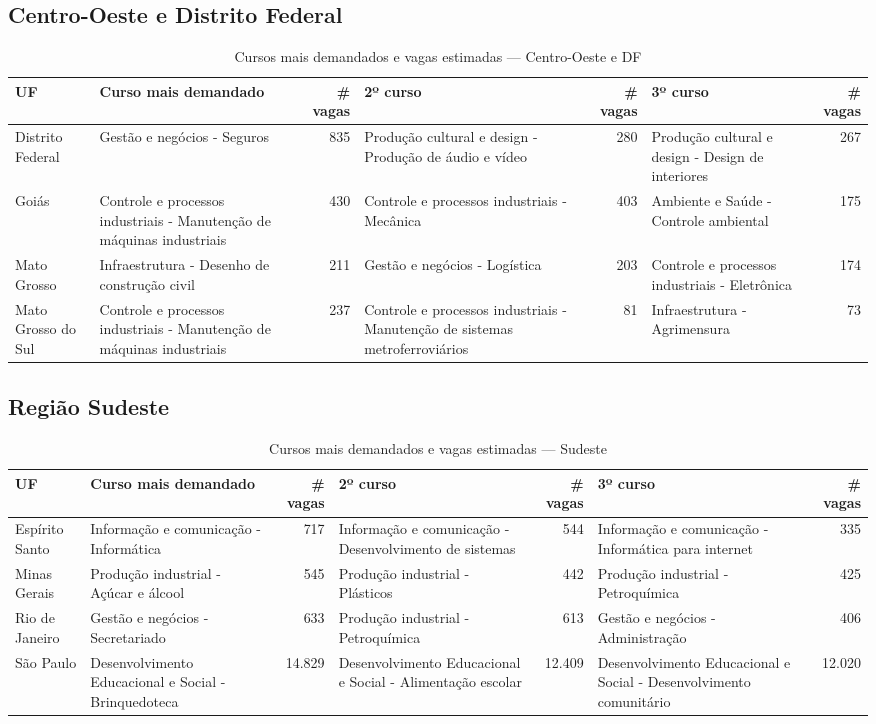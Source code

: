 \subsection{Centro-Oeste e Distrito Federal}
\begin{table}[ht]
\centering
\caption{Cursos mais demandados e vagas estimadas — Centro-Oeste e DF}
\label{tab:centro_oeste_df}
\begin{tabular}{l l r l r l r}
\toprule
UF & Curso mais demandado & \# vagas & 2º curso & \# vagas & 3º curso & \# vagas \\
\midrule
Distrito Federal & Gestão e negócios - Seguros & 835 & Produção cultural e design - Produção de áudio e vídeo & 280 & Produção cultural e design - Design de interiores & 267 \\
Goiás & Controle e processos industriais - Manutenção de máquinas industriais & 430 & Controle e processos industriais - Mecânica & 403 & Ambiente e Saúde - Controle ambiental & 175 \\
Mato Grosso & Infraestrutura - Desenho de construção civil & 211 & Gestão e negócios - Logística & 203 & Controle e processos industriais - Eletrônica & 174 \\
Mato Grosso do Sul & Controle e processos industriais - Manutenção de máquinas industriais & 237 & Controle e processos industriais - Manutenção de sistemas metroferroviários & 81 & Infraestrutura - Agrimensura & 73 \\
\bottomrule
\end{tabular}
\end{table}

\subsection{Região Sudeste}
\begin{table}[ht]
\centering
\caption{Cursos mais demandados e vagas estimadas — Sudeste}
\label{tab:sudeste}
\begin{tabular}{l l r l r l r}
\toprule
UF & Curso mais demandado & \# vagas & 2º curso & \# vagas & 3º curso & \# vagas \\
\midrule
Espírito Santo & Informação e comunicação - Informática & 717 & Informação e comunicação - Desenvolvimento de sistemas & 544 & Informação e comunicação - Informática para internet & 335 \\
Minas Gerais & Produção industrial - Açúcar e álcool & 545 & Produção industrial - Plásticos & 442 & Produção industrial - Petroquímica & 425 \\
Rio de Janeiro & Gestão e negócios - Secretariado & 633 & Produção industrial - Petroquímica & 613 & Gestão e negócios - Administração & 406 \\
São Paulo & Desenvolvimento Educacional e Social - Brinquedoteca & 14.829 & Desenvolvimento Educacional e Social - Alimentação escolar & 12.409 & Desenvolvimento Educacional e Social - Desenvolvimento comunitário & 12.020 \\
\bottomrule
\end{tabular}
\end{table}

